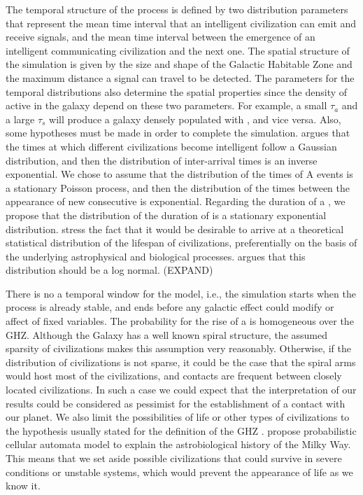 The temporal structure of the process is defined by two distribution
parameters that represent the mean time interval that an intelligent
civilization can emit and receive signals, and the mean time interval
between the emergence of an intelligent communicating civilization and
the next one.
%
The spatial structure of the simulation is given by the size and shape
of the Galactic Habitable Zone and the maximum distance a signal can
travel to be detected.
%
The parameters for the temporal distributions also determine the
spatial properties since the density of active \cetis{} in the galaxy
depend on these two parameters.
%
For example, a small $\tau_a$ and a large $\tau_s$ will produce a
galaxy densely populated with \cetis{}, and vice versa.
%
Also, some hypotheses must be made in order to complete the
simulation.
%
\citet{forgan_spatiotemporal_2011} argues that the times at which
different civilizations become intelligent follow a Gaussian
distribution, and then the distribution of inter-arrival times is an
inverse exponential.
%
We chose to assume that the distribution of the times of A events is a
stationary Poisson process, and then the distribution of the times
between the appearance of new consecutive \cetis{} is exponential.
%
Regarding the duration of a \ceti{}, we propose that the distribution
of the duration of \cetis{} is a stationary exponential distribution.
%
\citet{balbi_impact_2018} stress the fact that it would be desirable
to arrive at a theoretical statistical distribution of the lifespan of
civilizations, preferentially on the basis of the underlying
astrophysical and biological processes.
%
\citet{maccone_lognormals_2014} argues that this distribution should
be a log normal.  (EXPAND)
 



There is no a temporal window for the model, i.e., the simulation
starts when the process is already stable, and ends before any
galactic effect could modify or affect of fixed variables.
%
The probability for the rise of a \ceti{} is homogeneous over the GHZ.
%
Although the Galaxy has a well known spiral structure, the assumed
sparsity of civilizations makes this assumption very reasonably.
%
Otherwise, if the distribution of civilizations is not sparse, it
could be the case that the spiral arms would host most of the
civilizations, and contacts are frequent between closely located
civilizations.
%
In such a case we could expect that the interpretation of our results
could be considered as pessimist for the establishment of a contact
with our planet.
%
We also limit the possibilities of life or other types of civilizations
to the hypothesis usually stated for the definition of the GHZ
\citep{dayal_habitability_2016, gonzalez_galactic_2001,
lineweaver_galactic_2004, gonzalez_habitable_2005,
morrison_extending_2015, haqq-misra_evolution_2019,
rahvar_cosmic_2016, gobat_evolution_2016, rahvar_cosmic_2016}.
%
\citet{vukotic_astrobiological_2012} propose probabilistic cellular
automata model to explain the astrobiological history of the Milky
Way.
%
This means that we set aside possible civilizations that could survive
in severe conditions or unstable systems, which would prevent the
appearance of life as we know it.


